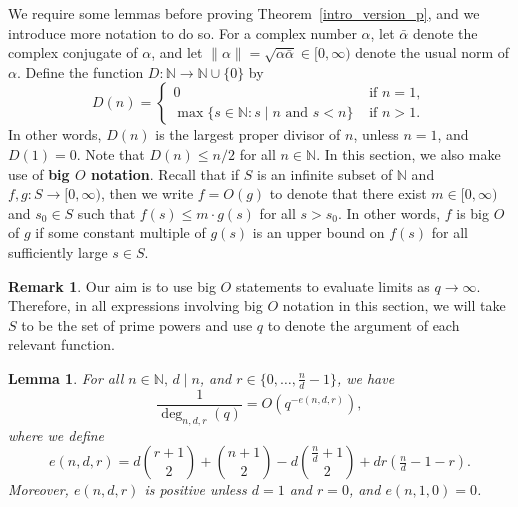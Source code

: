 \documentclass[10pt]{article}
\newtheorem{lemma}[theorem]{Lemma}
\theoremstyle{definition}
\newtheorem{remark}[theorem]{Remark}
\newcommand{\N}{\mathbb{N}}
\newcommand{\myemph}{\textbf}
\begin{document}
We require some lemmas before proving Theorem~\ref{intro_version_p}, and we introduce more notation to do so.
For a complex number \(\alpha\), let \(\bar{\alpha}\) denote the complex conjugate of \(\alpha\), and let \(\| \alpha \| = \sqrt{\alpha \bar{\alpha}} \in [0,\infty)\) denote the usual norm of \(\alpha\).
Define the function \(D : \N \to \N \cup \{0\}\) by
\begin{equation}
D(n) =
\begin{cases}
0 & \text{ if } n = 1, \\
\max \{ s \in \N : s \mid n \text{ and } s < n\} & \text{ if } n > 1.
\end{cases}
\end{equation}
In other words, \(D(n)\) is the largest proper divisor of \(n\), unless \(n = 1\), and \(D(1) = 0\).
Note that \(D(n) \leq n/2\) for all \(n \in \N\).
In this section, we also make use of \myemph{big \(O\) notation}.
Recall that if \(S\) is an infinite subset of \(\N\) and \(f,g : S \to [0,\infty)\), then we write \(f = O(g)\) to denote that there exist \(m \in [0,\infty)\) and \(s_0 \in S\) such that \(f(s) \leq m \cdot g(s)\) for all \(s > s_0\).
In other words, \(f\) is big \(O\) of \(g\) if some constant multiple of \(g(s)\) is an upper bound on \(f(s)\) for all sufficiently large \(s \in S\).

\begin{remark}
	Our aim is to use big \(O\) statements to evaluate limits as \(q \to \infty\).
	Therefore, in all expressions involving big \(O\) notation in this section, we will take \(S\) to be the set of prime powers and use \(q\) to denote the argument of each relevant function.
\end{remark}


\begin{lemma}
\label{degree_limit_lemma}
For all \(n \in \N, \, d \mid n\), and \(r \in \{0,\ldots,\tfrac{n}{d}-1\}\), we have
\begin{equation}
\frac{1}{\deg_{n,d,r} (q)}
=
O \left (
q^{-e(n,d,r)}
\right ),
\end{equation}
where we define
\begin{equation}
\label{definition_of_e}
e(n,d,r)
=
d\binom{r+1}{2} + \binom{n+1}{2} - d\binom{\tfrac{n}{d} + 1}{2} + dr\left ( \tfrac{n}{d}-1-r \right ).
\end{equation}
Moreover, \(e(n,d,r)\) is positive unless \(d = 1\) and \(r = 0\), and \(e(n,1,0) = 0\).
\end{lemma}
\end{document}
